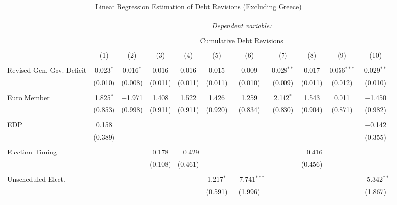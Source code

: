 \begin{table}[!htbp] \centering 
  \caption{Linear Regression Estimation of Debt Revisions (Excluding Greece)} 
  \label{results_no_greece} 
\tiny 
\begin{tabular}{@{\extracolsep{5pt}}lcccccccccc} 
\\[-1.8ex]\hline 
\hline \\[-1.8ex] 
 & \multicolumn{10}{c}{\textit{Dependent variable:}} \\ 
\cline{2-11} 
\\[-1.8ex] & \multicolumn{10}{c}{Cumulative Debt Revisions} \\ 
\\[-1.8ex] & (1) & (2) & (3) & (4) & (5) & (6) & (7) & (8) & (9) & (10)\\ 
\hline \\[-1.8ex] 
 Revised Gen. Gov. Deficit & 0.023$^{*}$ & 0.016$^{*}$ & 0.016 & 0.016 & 0.015 & 0.009 & 0.028$^{**}$ & 0.017 & 0.056$^{***}$ & 0.029$^{**}$ \\ 
  & (0.010) & (0.008) & (0.011) & (0.011) & (0.011) & (0.010) & (0.009) & (0.011) & (0.012) & (0.010) \\ 
  & & & & & & & & & & \\ 
 Euro Member & 1.825$^{*}$ & $-$1.971 & 1.408 & 1.522 & 1.426 & 1.259 & 2.142$^{*}$ & 1.543 & 0.011 & $-$1.450 \\ 
  & (0.853) & (0.998) & (0.911) & (0.911) & (0.920) & (0.834) & (0.830) & (0.904) & (0.871) & (0.982) \\ 
  & & & & & & & & & & \\ 
 EDP & 0.158 &  &  &  &  &  &  &  &  & $-$0.142 \\ 
  & (0.389) &  &  &  &  &  &  &  &  & (0.355) \\ 
  & & & & & & & & & & \\ 
 Election Timing &  &  & 0.178 & $-$0.429 &  &  &  & $-$0.416 &  &  \\ 
  &  &  & (0.108) & (0.461) &  &  &  & (0.456) &  &  \\ 
  & & & & & & & & & & \\ 
 Unscheduled Elect. &  &  &  &  & 1.217$^{*}$ & $-$7.741$^{***}$ &  &  &  & $-$5.342$^{**}$ \\ 
  &  &  &  &  & (0.591) & (1.996) &  &  &  & (1.867) \\ 
  & & & & & & & & & & \\ 

\end{tabular}
\end{table}
